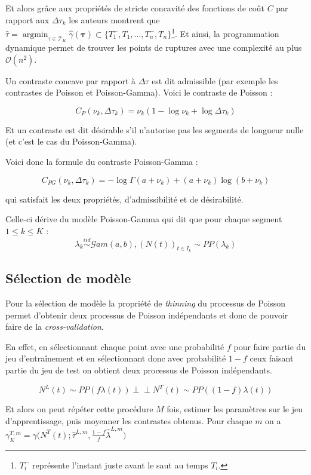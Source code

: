 \documentclass[a4paper,10pt]{article}\usepackage[]{graphicx}\usepackage[]{xcolor}
\DeclareMathOperator*{\argmin}{argmin}
\newcommand{\segspace}{\mathcal{T}_K}
\newcommand{\indep}{\perp \!\!\! \perp}
\begin{document}
Et alors grâce aux propriétés de stricte concavité des fonctions de coût $C$ par
rapport aux $\Delta \tau_k$ les auteurs montrent que $\hat{\tau} = 
\argmin_{\tau\in\segspace} \hat{\gamma}(\bm{\tau}) \subset \bigl\{ T^-_1, T_1, 
\dots, T^-_n, T_n \bigr\}$\footnote{$T_i^-$ représente l'instant juste avant le saut
au temps $T_i$.}. Et ainsi, la programmation dynamique permet de trouver
les points de ruptures avec une complexité au plus $\mathcal{O}(n^2)$.

Un contraste concave par rapport à $\Delta\tau$ est dit admissible (par exemple
les contrastes de Poisson et Poisson-Gamma). Voici le contraste de Poisson :

$$C_P(\nu_k, \Delta\tau_k) = \nu_k(1-\log \nu_k + \log \Delta\tau_k)$$

Et un contraste est dit désirable
s'il n'autorise pas les segments de longueur nulle (et c'est le cas du 
Poisson-Gamma).

Voici donc la formule du contraste Poisson-Gamma :

$$C_{PG}(\nu_k, \Delta\tau_k)=-\log\Gamma(a+\nu_k)+(a+\nu_k)\log(b+\nu_k)$$

qui satisfait les deux propriétés, d'admissibilité et de désirabilité.

Celle-ci dérive du modèle Poisson-Gamma qui dit que pour chaque segment 
$1\leq k \leq K$ :
$$\lambda_k \overset{iid}{\sim} \mathcal{G}am(a,b), (N(t))_{t\in I_k} \sim PP(\lambda_k)$$

\subsection{Sélection de modèle}

Pour la sélection de modèle la propriété de \emph{thinning} du processus de 
Poisson permet d'obtenir deux processus de Poisson indépendants et donc 
de pouvoir faire de la \emph{cross-validation}.

En effet, en sélectionnant chaque point avec une probabilité $f$ pour faire 
partie du jeu d'entraînement et en sélectionnant donc avec probabilité $1-f$ 
ceux faisant partie du jeu de test on obtient deux processus de Poisson 
indépendants.

$$N^L(t) \sim PP(f \lambda(t)) \indep N^T(t) \sim PP((1-f) \lambda(t))$$

Et alors on peut répéter cette procédure $M$ fois, estimer les paramètres sur le 
jeu d'apprentissage, 
puis moyenner les contrastes obtenus. 
Pour chaque $m$ on a $\gamma^{T,m}_K = \gamma \bigl( N^T(t);\hat{\tau}^{L,m},\frac{1-f}{f}\hat{\lambda}^{L,m} \bigr)$
\end{document}
